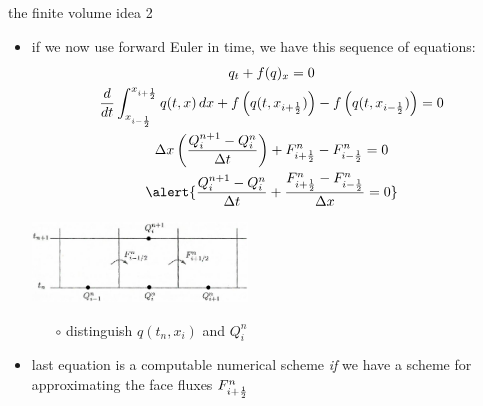 \documentclass[10pt,hyperref]{beamer}
\begin{document}
\begin{frame}{the finite volume idea 2}

\begin{itemize}
\item if we now use forward Euler in time, we have this sequence of equations:
\small
\begin{gather*}
q_t + f(q)_x = 0  \\
\frac{d}{dt} \int_\ximhalf^\xiphalf q(t,x) \,dx + f\left(q(t,\xiphalf)\right) - f\left(q(t,\ximhalf)\right) = 0 \\
\Delta x \left(\frac{Q_i^{n+1} - Q_i^n}{\Delta t}\right) + \Fiphalfn - \Fimhalfn = 0 \\
\alert{\frac{Q_i^{n+1} - Q_i^n}{\Delta t} + \frac{\Fiphalfn - \Fimhalfn}{\Delta x} = 0}
\end{gather*}

\hfill \includegraphics[width=0.45\textwidth]{figs/leveque4p1}

\normalsize

\vspace{-12mm}
    \begin{itemize}
    \item[$\circ$] distinguish $q(t_n,x_i)$ and $Q_i^n$
    \end{itemize}

\vspace{8mm}
\item \alert{last equation} is a computable numerical scheme \emph{if} we have a scheme for approximating the face fluxes ${F^n_{i+\frac{1}{2}}}$
\end{itemize}
\end{frame}

\newcommand{\Fiphalf}{{F^n_{i+\frac{1}{2}}}}
\newcommand{\Fimhalf}{{F^n_{i-\frac{1}{2}}}}
\end{document}
